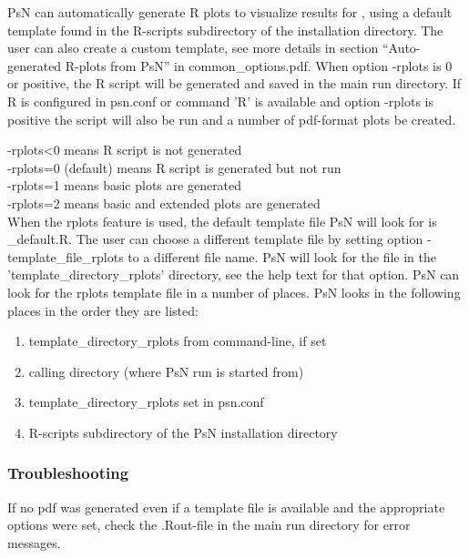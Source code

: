 
PsN can automatically generate R plots to visualize results for 
\guidetoolname, using a default template found in the R-scripts subdirectory of the installation directory.
The user can also create a custom template, see more details in section 
``Auto-generated R-plots from PsN'' in common\_options.pdf.
When option \mbox{-rplots} is 0 or positive, 
the R script will be generated and saved in the main
run directory. 
If R is configured in psn.conf or command 'R' is available and option -rplots is positive 
the script will also be run and a number of pdf-format plots be created.

\rplotsconditions

\begin{optionlist}
-rplots<0 means R script is not generated\\ 
-rplots=0 (default) means R script is generated but not run\\ 
-rplots=1 means basic plots are generated\\													  
-rplots=2 means basic and extended plots are generated\\													  
\nextopt
{}
When the rplots feature is used, the default template file PsN will look for is 
\guidetoolname\_default.R. 
The user can choose a different template file
by setting option -template\_file\_rplots to a different file name. 
PsN will look for the file in the 'template\_directory\_rplots' directory, see the help text 
for that option.
\nextopt
{}
PsN can look for the rplots template file in a number of places. 
PsN looks in the following places in the order they are listed:
\begin{enumerate}
\item template\_directory\_rplots from command-line, if set 
\item calling directory (where PsN run is started from)
\item template\_directory\_rplots set in psn.conf 
\item R-scripts subdirectory of the PsN installation directory
\end{enumerate}
\nextopt
\end{optionlist}

\subsubsection*{Troubleshooting}
If no pdf was generated even if a template file is available and the appropriate options
were set, check the .Rout-file in the main run directory for error messages.
